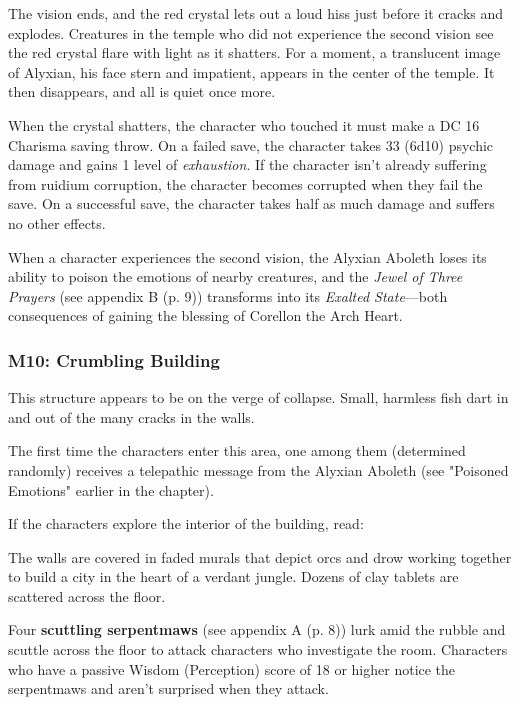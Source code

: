 \documentclass[letterpaper, 11pt, bg=full, twocolumn]{dndbook}
\begin{document}
The vision ends, and the red crystal lets out a loud hiss just before it cracks and explodes. Creatures in the temple who did not experience the second vision see the red crystal flare with light as it shatters. For a moment, a translucent image of Alyxian, his face stern and impatient, appears in the center of the temple. It then disappears, and all is quiet once more.

When the crystal shatters, the character who touched it must make a DC 16 Charisma saving throw. On a failed save, the character takes 33 (6d10) psychic damage and gains 1 level of \textit{exhaustion}. If the character isn't already suffering from ruidium corruption, the character becomes corrupted when they fail the save. On a successful save, the character takes half as much damage and suffers no other effects.

When a character experiences the second vision, the Alyxian Aboleth loses its ability to poison the emotions of nearby creatures, and the \textit{Jewel of Three Prayers} (see appendix B (p. 9)) transforms into its \textit{Exalted State}---both consequences of gaining the blessing of Corellon the Arch Heart.

\subsubsection{M10: Crumbling Building}

This structure appears to be on the verge of collapse. Small, harmless fish dart in and out of the many cracks in the walls.

The first time the characters enter this area, one among them (determined randomly) receives a telepathic message from the Alyxian Aboleth (see "Poisoned Emotions" earlier in the chapter).

If the characters explore the interior of the building, read:

\begin{DndReadAloud}
The walls are covered in faded murals that depict orcs and drow working together to build a city in the heart of a verdant jungle. Dozens of clay tablets are scattered across the floor.
\end{DndReadAloud}

Four \textbf{scuttling serpentmaws} (see appendix A (p. 8)) lurk amid the rubble and scuttle across the floor to attack characters who investigate the room. Characters who have a passive Wisdom (Perception) score of 18 or higher notice the serpentmaws and aren't surprised when they attack.
\end{document}
